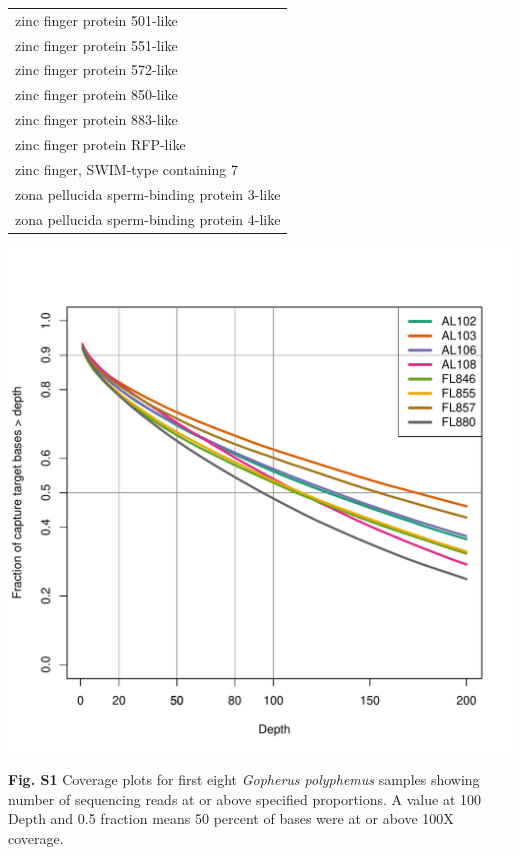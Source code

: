 \documentclass[english]{article}\usepackage[]{graphicx}\usepackage[]{color}
\makeatletter
\def\maxwidth{ %
  \ifdim\Gin@nat@width>\linewidth
    \linewidth
  \else
    \Gin@nat@width
  \fi
}
\newenvironment{knitrout}{}{} %
\makeatother
\begin{document}
\begin{longtable}{l}
zinc finger protein 501-like \\ 
zinc finger protein 551-like \\ 
zinc finger protein 572-like \\ 
zinc finger protein 850-like \\ 
zinc finger protein 883-like \\ 
zinc finger protein RFP-like \\ 
zinc finger, SWIM-type containing 7 \\ 
zona pellucida sperm-binding protein 3-like \\ 
zona pellucida sperm-binding protein 4-like \\ 
\hline
\end{longtable}

\pagebreak{}
\noindent
\begin{knitrout}
\color{fgcolor}
\includegraphics[width=\maxwidth]{figure/Figure-2-1} 

\end{knitrout}
\noindent
\textbf{Fig. S1} Coverage plots for first eight \textit{Gopherus polyphemus} samples showing number of sequencing reads at or above specified proportions. A value at 100 Depth and 0.5 fraction means 50 percent of bases were at or above 100X coverage.\\
\end{document}
